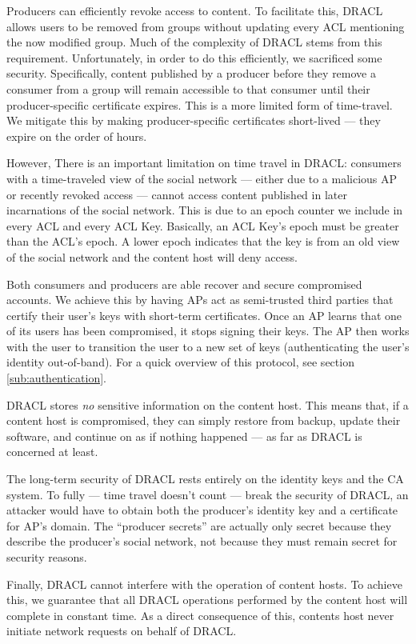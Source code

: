 \documentclass[pdftex,12pt,a4papaer,twoside,notitlepage]{report}
\begin{document}
Producers can efficiently revoke access to content. To facilitate this, DRACL
allows users to be removed from groups without updating every ACL mentioning the
now modified group. Much of the complexity of DRACL stems from this requirement.
Unfortunately, in order to do this efficiently, we sacrificed some security.
Specifically, content published by a producer before they remove a consumer from
a group will remain accessible to that consumer until their producer-specific
certificate expires. This is a more limited form of time-travel. We mitigate
this by making producer-specific certificates short-lived --- they expire on the
order of hours.

However, There is an important limitation on time travel in DRACL: consumers with a
time-traveled view of the social network --- either due to a malicious AP or
recently revoked access --- cannot access content published in later
incarnations of the social network. This is due to an epoch counter we include
in every ACL and every ACL Key. Basically, an ACL Key's epoch must be greater
than the ACL's epoch. A lower epoch indicates that the key is from an old view
of the social network and the content host will deny access.

Both consumers and producers are able recover and secure compromised accounts.
We achieve this by having APs act as semi-trusted third parties that certify
their user's keys with short-term certificates. Once an AP learns that one of
its users has been compromised, it stops signing their keys. The AP then works
with the user to transition the user to a new set of keys (authenticating the
user's identity out-of-band). For a quick overview of this protocol, see section
\ref{sub:authentication}.

DRACL stores \emph{no} sensitive information on the content host. This means
that, if a content host is compromised, they can simply restore from backup,
update their software, and continue on as if nothing happened --- as far as
DRACL is concerned at least.

The long-term security of DRACL rests entirely on the identity keys and the CA
system. To fully --- time travel doesn't count --- break the security of DRACL,
an attacker would have to obtain both the producer's identity key and a
certificate for AP's domain. The ``producer secrets'' are actually only secret
because they describe the producer's social network, not because they must
remain secret for security reasons.

Finally, DRACL cannot interfere with the operation of content hosts. To achieve
this, we guarantee that all DRACL operations performed by the content host will
complete in constant time. As a direct consequence of this, contents host never
initiate network requests on behalf of DRACL\@.
\end{document}
